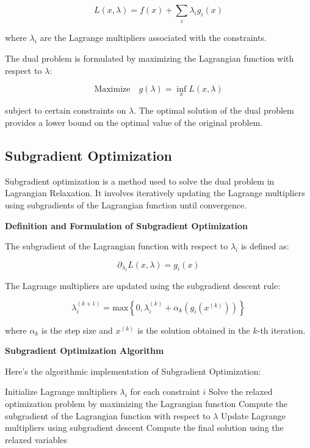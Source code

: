 \documentclass[12pt]{book} %
\begin{document}
\[
L(x, \lambda) = f(x) + \sum_{i} \lambda_i g_i(x)
\]

where $\lambda_i$ are the Lagrange multipliers associated with the constraints.

The dual problem is formulated by maximizing the Lagrangian function with respect to $\lambda$:

\[
\text{Maximize} \quad g(\lambda) = \inf_{x} L(x, \lambda)
\]

subject to certain constraints on $\lambda$. The optimal solution of the dual problem provides a lower bound on the optimal value of the original problem.

\subsection{Subgradient Optimization}

Subgradient optimization is a method used to solve the dual problem in Lagrangian Relaxation. It involves iteratively updating the Lagrange multipliers using subgradients of the Lagrangian function until convergence.

\textbf{Definition and Formulation of Subgradient Optimization}

The subgradient of the Lagrangian function with respect to $\lambda_i$ is defined as:

\[
\partial_{\lambda_i} L(x, \lambda) = g_i(x)
\]

The Lagrange multipliers are updated using the subgradient descent rule:

\[
\lambda_i^{(k+1)} = \text{max}\left\{0, \lambda_i^{(k)} + \alpha_k \left( g_i(x^{(k)}) \right)\right\}
\]

where $\alpha_k$ is the step size and $x^{(k)}$ is the solution obtained in the $k$-th iteration.

\textbf{Subgradient Optimization Algorithm}

Here's the algorithmic implementation of Subgradient Optimization:
\FloatBarrier
\begin{algorithm}[H]
\caption{Subgradient Optimization}
\begin{algorithmic}[1]
\State Initialize Lagrange multipliers $\lambda_i$ for each constraint $i$
    \State Solve the relaxed optimization problem by maximizing the Lagrangian function
    \State Compute the subgradient of the Lagrangian function with respect to $\lambda$
    \State Update Lagrange multipliers using subgradient descent
\EndWhile
\State Compute the final solution using the relaxed variables
\end{algorithmic}
\end{algorithm}
\end{document}
